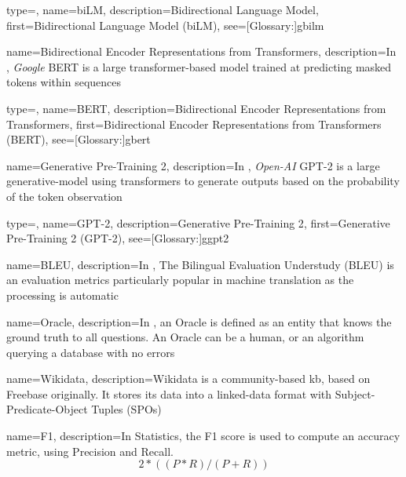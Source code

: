 {
  type=\acronymtype,
  name={biLM},
  description={Bidirectional Language Model},
  first={Bidirectional Language Model (biLM)},
  see=[Glossary:]{gbilm}
}

{
  name={Bidirectional Encoder Representations from Transformers},
  description={In , \textit{Google} BERT is a large \gls{transformer}-based model trained at predicting masked tokens within sequences}
}

{
  type=\acronymtype,
  name={BERT},
  description={Bidirectional Encoder Representations from Transformers},
  first={Bidirectional Encoder Representations from Transformers (BERT)},
  see=[Glossary:]{gbert}
}


{
  name={Generative Pre-Training 2},
  description={In , \textit{Open-AI} GPT-2 is a large \gls{generative-model} using \glspl{transformer} to generate outputs based on the probability of the token observation}
}

{
  type=\acronymtype,
  name={GPT-2},
  description={Generative Pre-Training 2},
  first={Generative Pre-Training 2 (GPT-2)},
  see=[Glossary:]{ggpt2}
}


{
  name={BLEU},
  description={In , The Bilingual Evaluation Understudy (BLEU) is an evaluation metrics particularly popular in machine translation as the processing is automatic}
}

{
  name={Oracle},
  description={In , an Oracle is defined as an entity that knows the ground truth to all questions. An Oracle can be a human, or an algorithm querying a database with no errors}
}

{
  name={Wikidata},
  description={Wikidata is a community-based \gls{kb}, based on Freebase originally. It stores its data into a linked-data format with Subject-Predicate-Object Tuples (SPOs)}
}

{
  name={F1},
  description={In Statistics, the F1 score is used to compute an accuracy metric, using Precision and Recall. \[ 2*((P*R)/(P+R)) \] }
}


